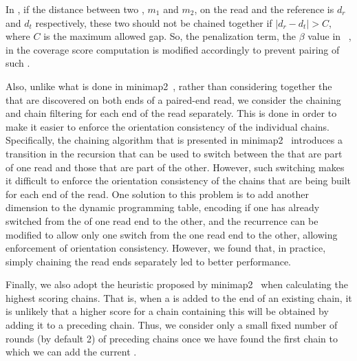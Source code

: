 In \puffaligner, if the distance between two \mems, $m_1$ and $m_2$,
on the read and the reference is $d_r$ and $d_t$ respectively, these
two \mems should not be chained together if $|d_r - d_t| > C$, where
$C$ is the maximum allowed gap. So, the penalization term, the
$\beta$ value in ~\citep{minimap2}, in the coverage score computation
is modified accordingly to prevent pairing of such \mems.

Also, unlike what is done in minimap2~\citep{minimap2}, rather than
considering together the \mems that are discovered on both ends of a
paired-end read, we consider the chaining and chain filtering for
each end of the read separately. This is done in order to make it
easier to enforce the orientation consistency of the individual
chains. Specifically, the chaining algorithm that is presented
in minimap2~\citep{minimap2} introduces a transition in the recursion that can
be used to switch between the \mems that are part of one read and
those that are part of the other. However, such switching makes it
difficult to enforce the orientation consistency of the chains that
are being built for each end of the read. One solution 
to this problem is to add another dimension to the dynamic programming
table, encoding if one has already switched from the \mems of one read end to
the other, and the recurrence can be modified to allow only one switch
from the one read end to the other, allowing enforcement of orientation
consistency. However, we found that, in practice, simply chaining the
read ends separately led to better performance.

Finally, we also adopt the heuristic proposed by minimap2~\citep{minimap2} when
calculating the highest scoring chains. That is, when a \mem is added
to the end of an existing chain, it is unlikely that a higher score
for a chain containing this \mem will be obtained by adding it to a
preceding chain. Thus, we consider only a small fixed number of
rounds (by default 2) of preceding chains once we have found the
first chain to which we can add the current \mem.

